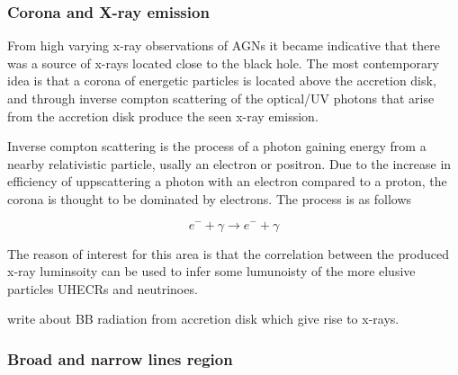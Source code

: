\documentclass{article}
\begin{document}
\subsubsection{Corona and X-ray emission}
From high varying x-ray observations of AGNs it became indicative that there was a source of x-rays located close to the black hole. 
The most contemporary idea is that a corona of energetic particles is located above the accretion disk, and through inverse compton scattering
of the optical/UV photons that arise from the accretion disk produce the seen x-ray emission. 

Inverse compton scattering is the process of a photon gaining energy from a nearby relativistic particle, usally an electron or positron. Due to the increase in efficiency 
of uppscattering a photon with an electron compared to a proton, the corona is thought to be dominated by electrons. The process is as follows

\begin{equation}
    e^- + \gamma \rightarrow e^- + \gamma 
\end{equation}

The reason of interest for this area is that the correlation between the produced x-ray luminsoity can be used to infer some lumunoisty of the more elusive 
particles UHECRs and neutrinoes. 




write about BB radiation from accretion disk which give rise to x-rays. 





\subsubsection{Broad and narrow lines region}
\end{document}
